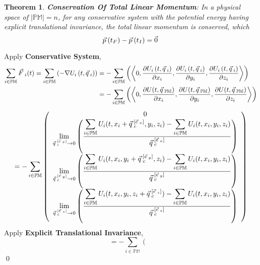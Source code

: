 \documentclass[12pt]{amsart}
\newtheorem{theorem}{Theorem}[section]
\renewenvironment{proof}{{\bfseries Proof.}}{\qed}
\let\oldvec\vec
\renewcommand{\vec}[1]{\oldvec{#1}\hspace{0.1em}}
\begin{document}
\begin{theorem}
    \textbf{Conservation Of Total Linear Momentum}: In a physical space of $\left | \mathbb{PM} \right | = n$, for any conservative system with the potential energy having explicit translational invariance, the total linear momentum is conserved, which $$ \vec{p}(t_F) - \vec{p}(t_I)  = \vec{0} $$
\end{theorem}

\begin{proof}
    Apply \textbf{Conservative System},
    \begin{align*}\displaystyle \sum_{i \in \mathbb{PM}} \vec{F}_i (t) = \displaystyle \sum_{i \in \mathbb{PM}} \left ( - \nabla  U_i \left ( t, \vec{q}_{i} \right ) \right ) &= - \displaystyle \sum_{i \in \mathbb{PM}} \left ( \left < 0, \dfrac{\partial  U_i \left ( t, \vec{q}_i \right )}{\partial x_i}, \dfrac{\partial  U_i \left ( t, \vec{q}_i \right )}{\partial y_i}, \dfrac{\partial  U_i \left ( t, \vec{q}_i \right )}{\partial z_i} \right > \right ) \\ &= - \displaystyle \sum_{i \in \mathbb{PM}} \left ( \left < 0, \dfrac{\partial U  (t, \vec{q}_\mathbb{PM})}{\partial x_i}, \dfrac{\partial U  (t, \vec{q}_\mathbb{PM})}{\partial y_i}, \dfrac{\partial U  (t, \vec{q}_\mathbb{PM})}{\partial z_i} \right > \right ) \end{align*}
     $$ = - \displaystyle \sum_{i \in \mathbb{PM}} \left( \begin{array}{c}
0 \\
\displaystyle \lim_{\vec{q}_c^{[\vec{e}_x]} \to 0} \left( \dfrac{\displaystyle \sum_{i \in \mathbb{PM}}  U_i(t, x_i+\vec{q}_c^{[\vec{e}_x]}, y_i, z_i)  - \displaystyle \sum_{i \in \mathbb{PM}}  U_i(t, x_i, y_i, z_i) }{\vec{q}_c^{[\vec{e}_x]}} \right) \\
\displaystyle \lim_{\vec{q}_c^{[\vec{e}_y]} \to 0} \left( \dfrac{\displaystyle \sum_{i \in \mathbb{PM}}  U_i(t, x_i, y_i+\vec{q}_c^{[\vec{e}_y]}, z_i) - \displaystyle \sum_{i \in \mathbb{PM}}  U_i(t, x_i, y_i, z_i) }{\vec{q}_c^{[\vec{e}_y]}} \right) \\
\displaystyle \lim_{\vec{q}_c^{[\vec{e}_z]} \to 0} \left( \dfrac{\displaystyle \sum_{i \in \mathbb{PM}} U_i(t, x_i, y_i, z_i+\vec{q}_c^{[\vec{e}_z]}) - \displaystyle \sum_{i \in \mathbb{PM}} U_i(t, x_i, y_i, z_i)}{\vec{q}_c^{[\vec{e}_z]}} \right)
\end{array} \right) $$
Apply \textbf{Explicit Translational Invariance},
$$ = - \displaystyle \sum_{i \in \mathbb{PM}} \left( \begin{array}{c}

\end{array}$$
\end{proof}
\end{document}

